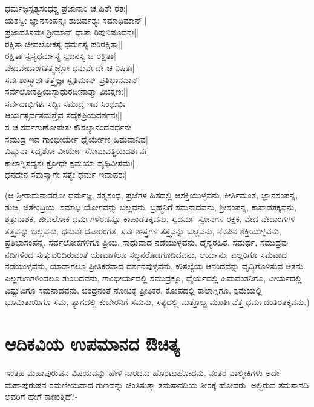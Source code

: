 \begin{shloka} 
ಧರ್ಮಜ್ಞಸ್ಸತ್ಯಸಂಧಶ್ಚ ಪ್ರಜಾನಾಂ ಚ ಹಿತೇ ರತಃ|\label{155}\\ 
ಯಶಸ್ವೀ ಜ್ಞಾನಸಂಪನ್ನಃ ಶುಚಿರ್ವಶ್ಯಃ ಸಮಾಧಿಮಾನ್||\\ 
ಪ್ರಜಾಪತಿಸಮಃ ಶ್ರೀಮಾನ್ ಧಾತಾ ರಿಪುನಿಷೂದನಃ||\\ 
ರಕ್ಷಿತಾ ಜೀವಲೋಕಸ್ಯ ಧರ್ಮಸ್ಯ ಪರಿರಕ್ಷಿತಾ||\\ 
ರಕ್ಷಿತಾ ಸ್ವಸ್ಯಧರ್ಮಸ್ಯ ಸ್ವಜನಸ್ಯ ಚ ರಕ್ಷಿತಾ|\\ 
ವೇದವೇದಾಂಗತತ್ತ್ವಜ್ಞೋ ಧನುರ್ವೆದೇ ಚ ನಿಷ್ಠಿತಃ||\\ 
ಸರ್ವಶಾಸ್ತ್ರಾರ್ಥತತ್ತ್ವಜ್ಞಃ ಸ್ಪೃತಿಮಾನ್ ಪ್ರತಿಭಾನವಾನ್|\\ 
ಸರ್ವಲೋಕಪ್ರಿಯಸ್ಸಾಧುರದೀನಾತ್ಮಾ ವಿಚಕ್ಷಣಃ||\\ 
ಸರ್ವದಾಭಿಗತಃ ಸದ್ಭಿಃ ಸಮುದ್ರ ಇವ ಸಿಂಧುಭಿಃ|\\ 
ಆರ್ಯಸ್ಸರ್ವಸಮಶ್ಚೈವ ಸದೈಕಪ್ರಿಯದರ್ಶನಃ||\\ 
ಸ ಚ ಸರ್ವಗುಣೋಪೇತಃ ಕೌಸಲ್ಯಾನಂದವರ್ಧನಃ|\\ 
ಸಮುದ್ರ ಇವ ಗಾಂಭೀರ್ಯೇ ಧೈರ್ಯೇಣ ಹಿಮವಾನಿವ||\\ 
ವಿಷ್ಣುನಾ ಸದೃಶೋ ವೀರ್ಯೇ ಸೋಮವತ್ಪ್ರಿಯದರ್ಶನಃ|\\ 
ಕಾಲಾಗ್ನಿಸದೃಶಃ ಕ್ರೋಧೇ ಕ್ಷಮಯಾ ಪೃಥಿವೀಸಮಃ||\\ 
ಧನದೇನ ಸಮಸ್ತ್ಯಾಗೇ ಸತ್ಯೇ ಧರ್ಮ ಇವಾಪರಃ|
\end{shloka} 

(ಆ ಶ್ರೀರಾಮನಾದರೋ ಧರ್ಮಜ್ಞ, ಸತ್ಯಸಂಧ, ಪ್ರಜೆಗಳ ಹಿತದಲ್ಲಿ ಆಸಕ್ತಿಯುಳ್ಳವನು, ಕೀರ್ತಿಮಂತ, ಜ್ಞಾನಸಂಪನ್ನ, ಶುಚಿ, ಜಿತೇಂದ್ರಿಯ, ಸಮಾಧಿ ಯೋಗವನ್ನು ಬಲ್ಲವನು, ಬ್ರಹ್ಮನಿಗೆ ಸಮನಾದವನು, ಶ್ರೀಸಂಪನ್ನ, ಕಾಪಾಡತಕ್ಕವನು, ಶತ್ರುನಾಶಕ, ಜೀವಲೋಕ-ಧರ್ಮಗಳೆರಡನ್ನೂ ಕಾಪಾಡತಕ್ಕವನು, ಸ್ವಧರ್ಮ ಸ್ವಜನಗಳ ರಕ್ಷಕ, ವೇದ ವೇದಾಂಗಗಳ ತತ್ತ್ವವನ್ನು ಬಲ್ಲವನು, ಧನುರ್ವೆದಪಾರಂಗತ, ಸರ್ವಶಾಸ್ತ್ರಗಳ ತತ್ತ್ವವನ್ನು ಬಲ್ಲವನು, ನೆನಪಿನ ಶಕ್ತಿಯುಳ್ಳವನು, ಪ್ರತಿಭಾಸಂಪನ್ನ, ಸರ್ವಲೋಕಗಳಿಗೂ ಪ್ರಿಯ, ಸಾಧುವಾದ ನಡೆಯುಳ್ಳವನು, ದೈನ್ಯರಹಿತ, ಸಮರ್ಥ, ಸಮುದ್ರವು ನದಿಗಳಿಂದ ಸುತ್ತುವರಿದಿರುವಂತೆ ಯಾವಾಗಲೂ ಸಜ್ಜನರೊಡಗೂಡಿದವನು, ಆರ್ಯನು, ಎಲ್ಲರಿಗೂ ಸಮವಾದ ನಡೆಯುಳ್ಳವನು, ಯಾವಾಗಲೂ ಪ್ರೀತಿಕರವಾದ ದರ್ಶನವುಳ್ಳವನು, ಕೌಸಲ್ಯೆಯ ಆನಂದವನ್ನು ವೃದ್ಧಿಗೊಳಿಸುವ ಆತನು ಎಲ್ಲಗುಣಗಳಿಂದಲೂ ತುಂಬಿದವನು, ಗಾಂಭೀರ್ಯದಲ್ಲಿ ಸಮುದ್ರಕ್ಕೂ, ಧೈರ್ಯದಲ್ಲಿ ಹಿಮವಂತನಿಗೂ, ವೀರ್ಯದಲ್ಲಿ ವಿಷ್ಣುವಿಗೂ ಸಮನಾದವನು, ಚಂದ್ರನಂತೆ ನೋಟಕ್ಕೆ ಪ್ರೀತಿಕರ, ಕೋಪದಲ್ಲಿ ಕಾಲಾಗ್ನಿಗೂ, ಕ್ಷಮೆಯಲ್ಲಿ ಭೂಮಿತಾಯಿಗೂ ಸಮ, ತ್ಯಾಗದಲ್ಲಿ ಕುಬೇರನಿಗೆ ಸಮನು, ಸತ್ಯದಲ್ಲಿ ಮತ್ತೊಬ್ಬ ಮೂರ್ತಿವೆತ್ತ ಧರ್ಮದಂತಿರತಕ್ಕವನು.) 

\section*{ಆದಿಕವಿಯ ಉಪಮಾನದ ಔಚಿತ್ಯ} 

ಇಂತಹ ಮಹಾಪುರುಷನ ವಿಷಯವನ್ನು ಹೇಳಿ ನಾರದನು ಹೊರಟುಹೋದನು. ನಂತರ ವಾಲ್ಮೀಕಿಗಳು ಅದೇ ಮಹಾಪುರುಷನ ರಮಣೀಯವಾದ ಗುಣವನ್ನು ಚಿಂತಿಸುತ್ತಾ ತಮಸಾನದಿಯ ತೀರಕ್ಕೆ ಹೋದರು. ಅಲ್ಲಿರುವ ತಮಸಾನದಿ ಅವರಿಗೆ ಹೇಗೆ ಕಾಣುತ್ತಿದೆ?- 

